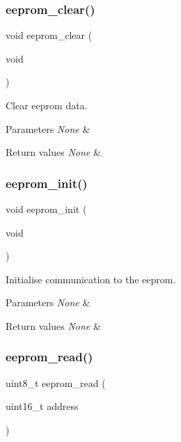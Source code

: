 \subsubsection{\texorpdfstring{eeprom\+\_\+clear()}{eeprom\_clear()}}
{\footnotesize\ttfamily void eeprom\+\_\+clear (\begin{DoxyParamCaption}\item[{void}]{ }\end{DoxyParamCaption})}



Clear eeprom data. 


\begin{DoxyParams}{Parameters}
{\em None} & \\
\hline
\end{DoxyParams}

\begin{DoxyRetVals}{Return values}
{\em None} & \\
\hline
\end{DoxyRetVals}
\mbox{\label{group___eeprom_ga4ec7f9d780da432051aa74ec5892a94c}} 
\subsubsection{\texorpdfstring{eeprom\+\_\+init()}{eeprom\_init()}}
{\footnotesize\ttfamily void eeprom\+\_\+init (\begin{DoxyParamCaption}\item[{void}]{ }\end{DoxyParamCaption})}



Initialise communication to the eeprom. 


\begin{DoxyParams}{Parameters}
{\em None} & \\
\hline
\end{DoxyParams}

\begin{DoxyRetVals}{Return values}
{\em None} & \\
\hline
\end{DoxyRetVals}
\mbox{\label{group___eeprom_gafaa7cca6f6ad1d9ae49522324c825c2f}} 
\subsubsection{\texorpdfstring{eeprom\+\_\+read()}{eeprom\_read()}}
{\footnotesize\ttfamily uint8\+\_\+t eeprom\+\_\+read (\begin{DoxyParamCaption}\item[{uint16\+\_\+t}]{address }\end{DoxyParamCaption})}



